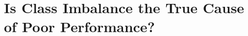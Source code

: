 \documentclass[12pt, a4paper, openany]{book}
\theoremstyle{plain}
\theoremstyle{definition}
\begin{document}
\mainmatter

\part{Is Class Imbalance the True Cause of Poor Performance?}
\label{part:causality}







\cleardoublepage
{}
{}
\printbibliography[title={Bibliography}]
\end{document}
